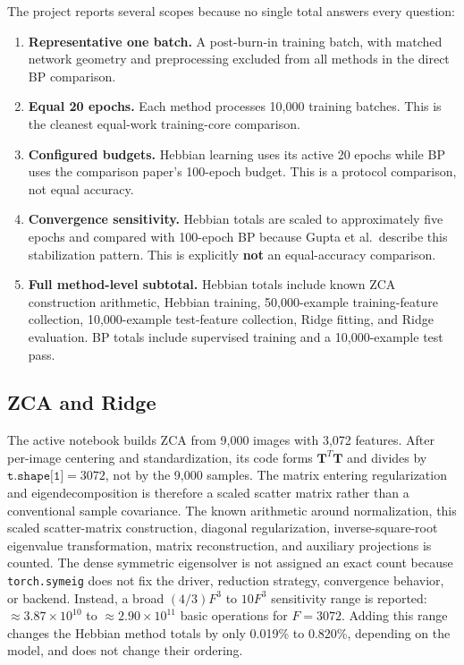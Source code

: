 \documentclass{article}
\begin{document}
    The project reports several scopes because no single total answers every question:
    \begin{enumerate}[noitemsep]
    \item \textbf{Representative one batch.} A post-burn-in training batch, with matched network geometry and preprocessing excluded from all methods in the direct BP comparison.
    \item \textbf{Equal 20 epochs.} Each method processes 10,000 training batches. This is the cleanest equal-work training-core comparison.
    \item \textbf{Configured budgets.} Hebbian learning uses its active 20 epochs while BP uses the comparison paper's 100-epoch budget. This is a protocol comparison, not equal accuracy.
    \item \textbf{Convergence sensitivity.} Hebbian totals are scaled to approximately five epochs and compared with 100-epoch BP because Gupta et al.\ describe this stabilization pattern. This is explicitly \textbf{not} an equal-accuracy comparison.
    \item \textbf{Full method-level subtotal.} Hebbian totals include known ZCA construction arithmetic, Hebbian training, 50,000-example training-feature collection, 10,000-example test-feature collection, Ridge fitting, and Ridge evaluation. BP totals include supervised training and a 10,000-example test pass.
    \end{enumerate}
    
    \subsection{ZCA and Ridge}
    
    The active notebook builds ZCA from 9,000 images with 3,072 features. After per-image centering and standardization, its code forms $\mathbf{T}^T \mathbf{T}$ and divides by $\texttt{t.shape[1]} = 3072$, not by the 9,000 samples. The matrix entering regularization and eigendecomposition is therefore a scaled scatter matrix rather than a conventional sample covariance. The known arithmetic around normalization, this scaled scatter-matrix construction, diagonal regularization, inverse-square-root eigenvalue transformation, matrix reconstruction, and auxiliary projections is counted. The dense symmetric eigensolver is not assigned an exact count because \texttt{torch.symeig} does not fix the driver, reduction strategy, convergence behavior, or backend. Instead, a broad $(4/3)F^3$ to $10F^3$ sensitivity range is reported: $\approx 3.87\times 10^{10}$ to $\approx 2.90\times 10^{11}$ basic operations for $F = 3072$. Adding this range changes the Hebbian method totals by only 0.019\% to 0.820\%, depending on the model, and does not change their ordering.
    
\end{document}
